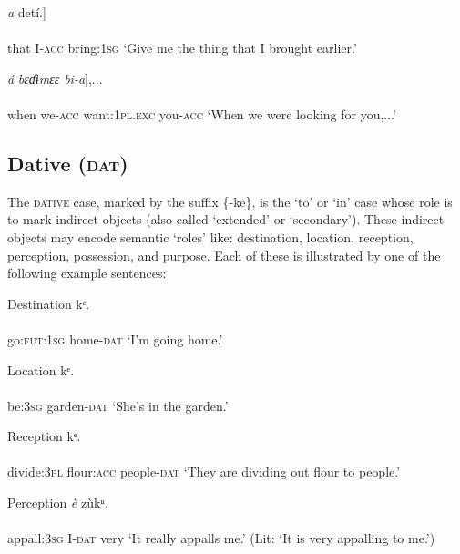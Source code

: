 \ea\label{ex:}
\gll {[náa   ɲci-}\textit{a}   detí.] \\
    \\
that\textsc{}  I-\textsc{acc}   bring:\textsc{1sg}
\glt ‘Give me the thing that I brought earlier.’ 
\z




\ea\label{ex:}
\gll {[Noo   ŋgó-}\textit{á}\textit{     bɛɗɨmɛɛ     bi-}\textit{a}],... \\
    \\
when   we-\textsc{acc}   want:\textsc{1pl.exc}   you-\textsc{acc}
\glt ‘When we were looking for you,...’ 
\z






\subsection{Dative (\textsc{dat})}


The \textsc{dative} case, marked by the suffix \{-ke\}, is the ‘to’ or ‘in’ case whose role is to mark indirect objects (also called ‘extended’ or ‘secondary’). These indirect objects may encode semantic ‘roles’ like: destination, location, reception, perception, possession, and purpose. Each of these is illustrated by one of the following example sentences:




Destination
\ea\label{ex:}
kᵉ. \\
    \\
go:\textsc{fut:1sg}   home-\textsc{dat}
\glt ‘I’m going home.’ 
\z




Location
\ea\label{ex:}
kᵉ. \\
    \\
be:\textsc{3sg}   garden-\textsc{dat}
\glt ‘She’s in the garden.’ 
\z


Reception
\ea\label{ex:}
kᵉ. \\
    \\
divide:\textsc{3pl}   flour:\textsc{acc}   people-\textsc{dat}
\glt ‘They are dividing out flour to people.’ 
\z




Perception
\ea\label{ex:}
\textit{è}   zùkᵘ. \\
    \\
appall:\textsc{3sg}   I-\textsc{dat}   very
\glt ‘It really appalls me.’ (Lit: ‘It is very appalling to me.’) 
\z




